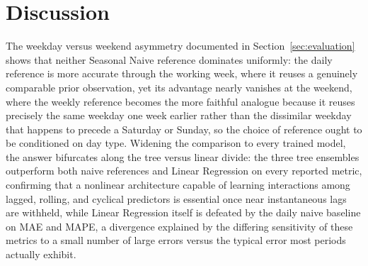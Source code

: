 \documentclass[runningheads]{llncs}
\begin{document}
\section{Discussion}
\label{sec:discussion}

The weekday versus weekend asymmetry documented in Section~\ref{sec:evaluation} shows that neither Seasonal Naive reference dominates uniformly: the daily reference is more accurate through the working week, where it reuses a genuinely comparable prior observation, yet its advantage nearly vanishes at the weekend, where the weekly reference becomes the more faithful analogue because it reuses precisely the same weekday one week earlier rather than the dissimilar weekday that happens to precede a Saturday or Sunday, so the choice of reference ought to be conditioned on day type. Widening the comparison to every trained model, the answer bifurcates along the tree versus linear divide: the three tree ensembles outperform both naive references and Linear Regression on every reported metric, confirming that a nonlinear architecture capable of learning interactions among lagged, rolling, and cyclical predictors is essential once near instantaneous lags are withheld, while Linear Regression itself is defeated by the daily naive baseline on MAE and MAPE, a divergence explained by the differing sensitivity of these metrics to a small number of large errors versus the typical error most periods actually exhibit.
\end{document}
